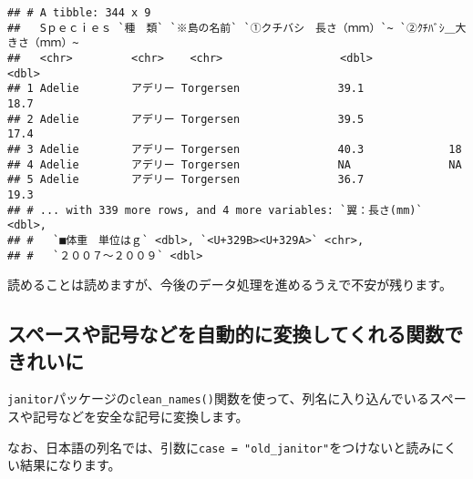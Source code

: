 \documentclass[
  xelatex,ja=standard, b5paper]{bxjsbook}
\newenvironment{Shaded}{\begin{snugshade}}{\end{snugshade}}
\newcommand{\DataTypeTok}[1]{\textcolor[rgb]{0.13,0.29,0.53}{#1}}
\newcommand{\KeywordTok}[1]{\textcolor[rgb]{0.13,0.29,0.53}{\textbf{#1}}}
\newcommand{\NormalTok}[1]{#1}
\newcommand{\OperatorTok}[1]{\textcolor[rgb]{0.81,0.36,0.00}{\textbf{#1}}}
\newcommand{\StringTok}[1]{\textcolor[rgb]{0.31,0.60,0.02}{#1}}
\begin{document}
\begin{verbatim}
## # A tibble: 344 x 9
##   Sｐｅｃｉｅｓ `種　類` `※島の名前` `①クチバシ　長さ（ｍｍ）`~ `②ｸﾁﾊﾞｼ＿大きさ（ｍｍ）~
##   <chr>         <chr>    <chr>                  <dbl>            <dbl>
## 1 Adelie        アデリー Torgersen               39.1             18.7
## 2 Adelie        アデリー Torgersen               39.5             17.4
## 3 Adelie        アデリー Torgersen               40.3             18  
## 4 Adelie        アデリー Torgersen               NA               NA  
## 5 Adelie        アデリー Torgersen               36.7             19.3
## # ... with 339 more rows, and 4 more variables: `翼：長さ(mm)` <dbl>,
## #   `■体重　単位はｇ` <dbl>, `<U+329B><U+329A>` <chr>,
## #   `２００７～２００９` <dbl>
\end{verbatim}

読めることは読めますが、今後のデータ処理を進めるうえで不安が残ります。

\hypertarget{ux30b9ux30daux30fcux30b9ux3084ux8a18ux53f7ux306aux3069ux3092ux81eaux52d5ux7684ux306bux5909ux63dbux3057ux3066ux304fux308cux308bux95a2ux6570ux3067ux304dux308cux3044ux306b}{%
\subsection{スペースや記号などを自動的に変換してくれる関数できれいに}\label{ux30b9ux30daux30fcux30b9ux3084ux8a18ux53f7ux306aux3069ux3092ux81eaux52d5ux7684ux306bux5909ux63dbux3057ux3066ux304fux308cux308bux95a2ux6570ux3067ux304dux308cux3044ux306b}}

\texttt{janitor}パッケージの\texttt{clean\_names()}関数を使って、列名に入り込んでいるスペースや記号などを安全な記号に変換します。

なお、日本語の列名では、引数に\texttt{case\ =\ "old\_janitor"}をつけないと読みにくい結果になります。

\begin{Shaded}
\end{Shaded}
\end{document}
